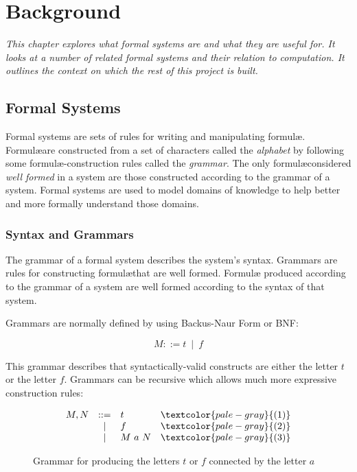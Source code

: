 
\chapter{Background}\label{chapter:background}

\textit{
This chapter explores what \emph{formal systems} are and what they are useful for. 
It looks at a number of related formal systems and their relation to computation. 
It outlines the context on which the rest of this project is built.
}


\section{Formal Systems}

Formal systems are sets of rules for writing and manipulating
formul\ae. Formul\ae are constructed from a set of characters called the
\emph{alphabet} by following some formul\ae-construction rules called
the \emph{grammar}. The only formul\ae considered \emph{well formed} in
a system are those constructed according to the grammar of a system.
Formal systems are used to model domains of knowledge to help better
and more formally understand those domains.

\subsection{Syntax and Grammars}

The grammar of a formal system describes the system's syntax. Grammars are 
rules for constructing formul\ae that are well formed. Formul\ae
produced according to the grammar of a system are well formed according to 
the syntax of that system.

Grammars are normally defined by using Backus-Naur Form or BNF:

\[
  M ::= t\ \mid\ f
\]

This grammar describes that syntactically-valid constructs are either the letter $t$ or the letter $f$. 
Grammars can be recursive which allows much more expressive construction rules:

\begin{figure}[!h]\label{fig:tf-grammar}
\[
  \begin{array}{lclr}
    M,N&::=&t&\textcolor{pale-gray}{(1)} \\
      &|&f&\textcolor{pale-gray}{(2)} \\
      &|&M\ a\ N&\textcolor{pale-gray}{(3)} \\
  \end{array}
\]
\caption{Grammar for producing the letters $t$ or $f$ connected by the letter $a$}
\end{figure}

